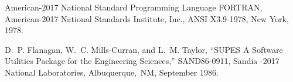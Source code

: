 \begin{thebibliography}{999}

\filbreak{} American-2017 National Standard Programming
                        Language FORTRAN,
                        American-2017 National Standards Institute, Inc.,
                        ANSI X3.9-1978, New York, 1978.

\filbreak{}
D.~P. Flanagan, W.~C. Mills-Curran, and L.~M. Taylor, ``{SUPES} A Software
  Utilities Package for the Engineering Sciences,'' SAND86-0911, Sandia
 -2017 National Laboratories, Albuquerque,~NM, September 1986.

\end{thebibliography}
